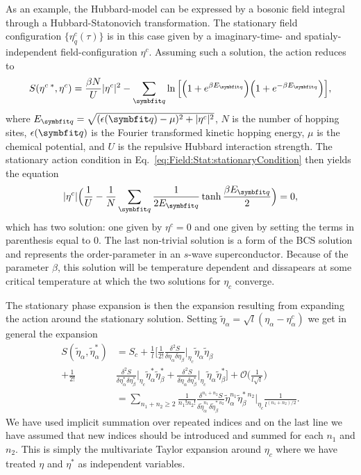 As an example, the Hubbard-model can be expressed by a bosonic field integral through a Hubbard-Statonovich transformation.
The stationary field configuration $\{\eta^c_q(\tau)\}$ is in this case given by a imaginary-time- and spatialy-independent
field-configuration $\eta^c$. Assuming such a solution, the action reduces to
\begin{equation}
    \label{eq:Field:Stat:meanFieldHubbard}
    S(\eta^{c\;\ast}, \eta^c) = \frac{\beta N}{U}|\eta^c|^2 - \sum_\v{q}\ln\Big[\Big(1+e^{\beta E_\v{q}}\Big)\Big(1+e^{-\beta E_\v{q}}\Big)\Big],
\end{equation}
where $E_\v{q} = \sqrt{(\epsilon(\v{q})-\mu)^2 + |\eta^c|^2}$, $N$ is the number of hopping sites, $\epsilon(\v{q})$ is the Fourier transformed
kinetic hopping energy, $\mu$ is the chemical potential, and $U$ is the repulsive Hubbard interaction strength. The stationary action condition
in Eq.~\eqref{eq:Field:Stat:stationaryCondition} then yields the equation
\begin{equation}
    \label{eq:Field:Stat:hubbardStationary}
    |\eta^c|\Big(\frac{1}{U} - \frac{1}{N}\sum_\v{q}\frac{1}{2E_\v{q}}\tanh\frac{\beta E_\v{q}}{2}\Big) = 0,
\end{equation}
which has two solution: one given by $\eta^c = 0$ and one given by setting the terms in parenthesis equal to $0$. The last non-trivial solution
is a form of the BCS solution and represents the order-parameter in an $s$-wave superconductor. Because of the parameter $\beta$, this
solution will be temperature dependent and dissapears at some critical temperature at which the two solutions for $\eta_c$ converge.

The stationary phase expansion is then the expansion resulting from expanding the action around the stationary solution. Setting
$\tilde{\eta}_\alpha = \sqrt{l}(\eta_\alpha-\eta^c_\alpha)$ we get in general the expansion
\begin{equation}
    \label{eq:Field:Stat:stationaryPhaseExpansion}
    \begin{split}
        S(\tilde{\eta}_\alpha,\tilde{\eta}_\alpha^\ast) &= S_c + \frac{1}{l}\bigg[\frac{1}{2!}\frac{\delta^2S}{\delta\eta_\alpha\delta\eta_\beta}\Big|_{\eta_c}\tilde{\eta}_\alpha\tilde{\eta}_\beta\\
        + \frac{1}{2!}&\frac{\delta^2S}{\delta\eta_\alpha^\ast\delta\eta_\beta^\ast}\Big|_{\eta_c}\tilde{\eta}^\ast_\alpha\tilde{\eta}^\ast_\beta
        + \frac{\delta^2S}{\delta\eta_\alpha\delta\eta_\beta^\ast}\Big|_{\eta_c}\tilde{\eta}_\alpha\tilde{\eta}_\beta^\ast\bigg] +  \mathcal{O}\Big(\frac{1}{l\sqrt{l}}\Big)\\
        &= \sum_{n_1+n_2\geq 2}\frac{1}{n_1!n_2!}\frac{\delta^{n_1+n_2}S}{\delta\tilde{\eta}_\alpha^{n_1}\delta\tilde{\eta}_\beta^{\ast\;n_2}}\tilde{\eta}_\alpha^{n_1}\tilde{\eta}_\beta^{\ast\;n_2}\Big|_{\eta_c}\frac{1}{l^{(n_1+n_2)/2}}.
    \end{split}
\end{equation}
We have used implicit summation over repeated indices and on the last line we have assumed that new indices should be introduced and summed for each $n_1$ and $n_2$.
This is simply the multivariate Taylor expansion around $\eta_c$ where we have treated $\eta$ and $\eta^\ast$ as independent variables.

